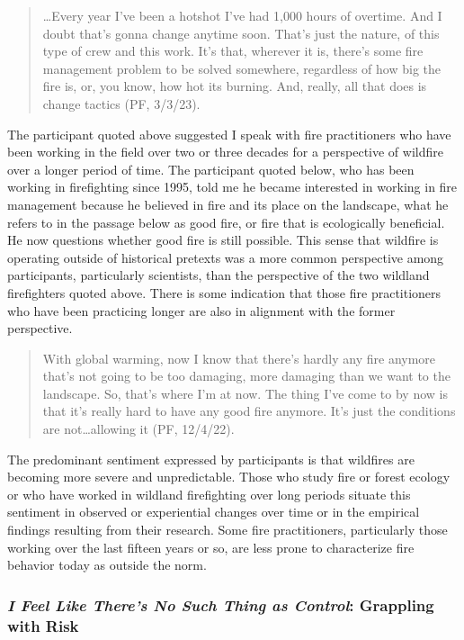\documentclass[
]{article}
\begin{document}
\begin{quote}
\ldots Every year I've been a hotshot I've had 1,000 hours of overtime. And I doubt that's gonna change anytime soon. That's just the nature, of this type of crew and this work. It's that, wherever it is, there's some fire management problem to be solved somewhere, regardless of how big the fire is, or, you know, how hot its burning. And, really, all that does is change tactics (PF, 3/3/23).
\end{quote}

The participant quoted above suggested I speak with fire practitioners who have been working in the field over two or three decades for a perspective of wildfire over a longer period of time. The participant quoted below, who has been working in firefighting since 1995, told me he became interested in working in fire management because he believed in fire and its place on the landscape, what he refers to in the passage below as good fire, or fire that is ecologically beneficial. He now questions whether good fire is still possible. This sense that wildfire is operating outside of historical pretexts was a more common perspective among participants, particularly scientists, than the perspective of the two wildland firefighters quoted above. There is some indication that those fire practitioners who have been practicing longer are also in alignment with the former perspective.

\begin{quote}
With global warming, now I know that there's hardly any fire anymore that's not going to be too damaging, more damaging than we want to the landscape. So, that's where I'm at now. The thing I've come to by now is that it's really hard to have any good fire anymore. It's just the conditions are not\ldots allowing it (PF, 12/4/22).
\end{quote}

The predominant sentiment expressed by participants is that wildfires are becoming more severe and unpredictable. Those who study fire or forest ecology or who have worked in wildland firefighting over long periods situate this sentiment in observed or experiential changes over time or in the empirical findings resulting from their research. Some fire practitioners, particularly those working over the last fifteen years or so, are less prone to characterize fire behavior today as outside the norm.

\subsubsection{\texorpdfstring{\emph{I Feel Like There's No Such Thing as Control}: Grappling with Risk}{I Feel Like There's No Such Thing as Control: Grappling with Risk}}\label{i-feel-like-theres-no-such-thing-as-control-grappling-with-risk}
\end{document}

